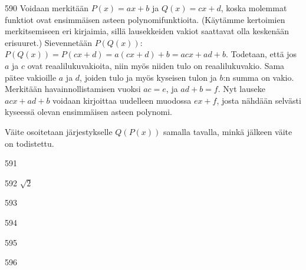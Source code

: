 \begin{Vastaus}{590}
Voidaan merkitään $P(x)=ax+b$ ja $Q(x)=cx+d$, koska molemmat funktiot ovat ensimmäisen asteen polynomifunktioita. (Käytämme kertoimien merkitsemiseen eri kirjaimia, sillä lausekkeiden vakiot saattavat olla keskenään erisuuret.) Sievennetään $P(Q(x))$: $P(Q(x))=P(cx+d)=a(cx+d)+b=acx+ad+b$. Todetaan, että jos $a$ ja $c$ ovat reaalilukuvakioita, niin myös niiden tulo on reaalilukuvakio. Sama pätee vakioille $a$ ja $d$, joiden tulo ja myös kyseisen tulon ja $b$:n summa on vakio. Merkitään havainnollistamisen vuoksi $ac=e$, ja $ad+b=f$. Nyt lauseke $acx+ad+b$ voidaan kirjoittaa uudelleen muodossa $ex+f$, josta nähdään selvästi kyseessä olevan ensimmäisen asteen polynomi.

Väite osoitetaan järjestykselle $Q(P(x))$ samalla tavalla, minkä jälkeen väite on todistettu.

	
\end{Vastaus}
\begin{Vastaus}{591}
	
\end{Vastaus}
\begin{Vastaus}{592}
$\sqrt{2}$
	
\end{Vastaus}
\begin{Vastaus}{593}
    
\end{Vastaus}
\begin{Vastaus}{594}
    
\end{Vastaus}
\begin{Vastaus}{595}
    
\end{Vastaus}
\begin{Vastaus}{596}
    
\end{Vastaus}
